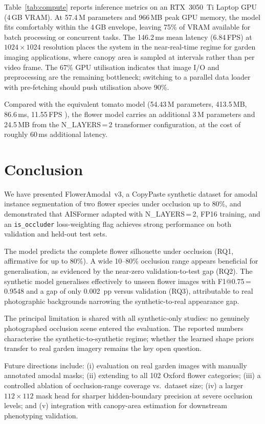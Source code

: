 \documentclass[conference]{IEEEtran}
\begin{document}
Table~\ref{tab:compute} reports inference metrics on an RTX~3050~Ti Laptop
GPU (4\,GB VRAM).
At 57.4\,M parameters and 966\,MB peak GPU memory, the model fits
comfortably within the 4\,GB envelope, leaving 75\% of VRAM available for
batch processing or concurrent tasks.
The 146.2\,ms mean latency (6.84\,FPS) at $1024{\times}1024$ resolution
places the system in the near-real-time regime for garden imaging
applications, where canopy area is sampled at intervals rather than per
video frame.
The 67\% GPU utilisation indicates that image I/O and preprocessing are
the remaining bottleneck; switching to a parallel data loader with
pre-fetching should push utilisation above 90\%.

Compared with the equivalent tomato model
(54.43\,M parameters, 413.5\,MB, 86.6\,ms, 11.55\,FPS
\cite{saadatpour2025tomato}), the flower model carries an additional
3\,M parameters and 24.5\,MB from the N\_LAYERS\,=\,2 transformer
configuration, at the cost of roughly 60\,ms additional latency.

\section{Conclusion}

We have presented FlowerAmodal~v3, a CopyPaste synthetic dataset for
amodal instance segmentation of two flower species under occlusion up to
80\%, and demonstrated that AISFormer adapted with N\_LAYERS\,=\,2,
FP16 training, and an \texttt{is\_occluder} loss-weighting flag achieves
strong performance on both validation and held-out test sets.

The model predicts the complete flower silhouette under occlusion
(RQ1, affirmative for up to 80\%).
A wide 10--80\% occlusion range appears beneficial for generalisation,
as evidenced by the near-zero validation-to-test gap (RQ2).
The synthetic model generalises effectively to unseen flower images
with F1@0.75\,=\,0.9548 and a gap of only 0.002~pp versus validation (RQ3),
attributable to real photographic backgrounds narrowing the synthetic-to-real
appearance gap.

The principal limitation is shared with all synthetic-only studies: no
genuinely photographed occlusion scene entered the evaluation.
The reported numbers characterise the synthetic-to-synthetic regime; whether
the learned shape priors transfer to real garden imagery remains the key
open question.

Future directions include:
(i) evaluation on real garden images with manually annotated amodal masks;
(ii) extending to all 102 Oxford flower categories;
(iii) a controlled ablation of occlusion-range coverage vs.\ dataset size;
(iv) a larger $112{\times}112$ mask head for sharper hidden-boundary
     precision at severe occlusion levels; and
(v) integration with canopy-area estimation for downstream phenotyping
    validation.
\end{document}
